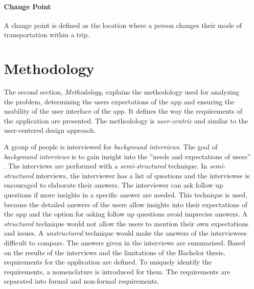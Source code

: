 \paragraph{Change Point} A change point is defined as the location where a person changes their mode of transportation within a trip. \cite{Zheng2008}

\section{Methodology}
The second section, \textit{Methodology}, explains the methodology used for analyzing the problem, determining the users expectations of the app and ensuring the usability of the user interface of the app. It defines the way the requirements of the application are presented. The methodology is \textit{user-centric} and similar to the user-centered design approach. 

A group of people is interviewed for \textit{background interviews}. The goal of \textit{background interviews} is to gain insight into the ''needs and expectations of users'' \cite{Abras2004}. The interviews are performed with a \textit{semi-structured} technique. In \textit{semi-structured} interviews, the interviewer has a list of questions and the interviewee is encouraged to elaborate their answers. The interviewer can ask follow up questions if more insights in a specific answer are needed. This technique is used, because the detailed answers of the users allow insights into their expectations of the app and the option for asking follow up questions avoid imprecise answers. A \textit{structured} technique would not allow the users to mention their own expectations and issues. A \textit{unstructured} technique would make the answers of the interviewees difficult to compare. The answers given in the interviews are summarised. Based on the results of the interviews and the limitations of the Bachelor thesis, requirements for the application are defined. To uniquely identify the requirements, a nomenclature is introduced for them. The requirements are separated into formal and non-formal requirements. \cite{Abras2004} \cite{wilson2013interview}

